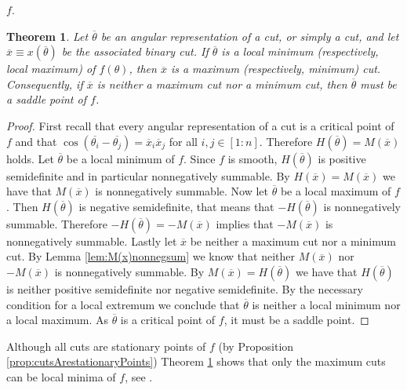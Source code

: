 \documentclass[12pt,a4paper]{article}
\theoremstyle{mythm}
\newtheorem{thm}{Theorem}[section]
\begin{document}
$ f $.
\begin{thm}
\label{thm:classificationcuts} 
Let $ \overline{ \theta }  $ be an angular representation of a cut, or simply a cut, and let $ \overline{ x } \equiv x( \overline{ \theta } ) $ be the associated binary cut. If $ \overline{ \theta }  $ is a local minimum
(respectively, local maximum) of $ f (\theta) $, then $ \overline{ x }  $ is a maximum (respectively, minimum) cut. 
Consequently, if $ \overline{ x }  $ is neither a maximum cut nor a minimum cut, then $ \overline{ \theta }  $ must be a saddle point of $ f $.
\end{thm} 
\begin{proof}
First recall that every angular representation of a cut is a critical point of $ f $ and that 
$ \cos( \overline{ \theta_i } - \overline{ \theta_j }  ) = \overline{ x }_i \overline{ x }_j  $ for all $ i,j \in \left[ 1:n \right]  $.
Therefore $ H( \overline{ \theta } ) = M( \overline{ x } ) $ holds.
Let $ \overline{ \theta }  $ be a local minimum of $ f $.
Since $ f $ is smooth, $ H ( \overline{ \theta } ) $ is positive semidefinite and in particular nonnegatively summable. By $ H ( \overline{ x } ) = M ( \overline{ x } ) $ we have
that $ M ( \overline{ x } ) $ is nonnegatively summable.
Now let $ \overline{ \theta }  $ be a local maximum of $ f $. Then $ H ( \overline{ \theta } ) $ is negative semidefinite, that means that $ - H ( \overline{ \theta } ) $ is
nonnegatively summable. Therefore $ - H ( \overline{ \theta } ) = - M ( \overline{ x } ) $ implies that $ - M ( \overline{ x } ) $ is nonnegatively summable.
Lastly let $ \overline{ x }  $ be neither a maximum cut nor a minimum cut.
By Lemma \ref{lem:M(x)nonnegsum} we know that neither $ M ( \overline{ x } ) $ nor $ - M ( \overline{ x } ) $ is nonnegatively summable. 
By $ M ( \overline{  x } ) = H ( \overline{ \theta } ) $ we have that $ H ( \overline{ \theta } )  $ is neither positive semidefinite nor negative semidefinite. By the
necessary condition for a local extremum we conclude that $ \overline{ \theta }  $ is neither a local minimum nor a local maximum. As $ \overline{ \theta }  $ is a critical
point of $ f $, it must be a saddle point.
\end{proof}
Although all cuts are stationary points of $ f $ (by Proposition \ref{prop:cutsArestationaryPoints}) Theorem \ref{thm:classificationcuts} shows that only the maximum cuts can be local minima of $ f $, see \cite[p. 508]{Burer2002}.
\end{document}
